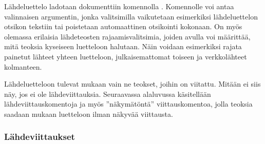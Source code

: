 \begin{koodilohkosis}



\end{koodilohkosis}

\noindent
Lähdeluettelo ladotaan dokumenttiin komennolla
. Komennolle voi antaa valinnaisen
argumentin, jonka valitsimilla vaikutetaan esimerkiksi lähdeluettelon
otsikon tekstiin tai poistetaan automaattinen otsikointi kokonaan. On
myös olemassa erilaisia lähdeteosten rajaamisvalitsimia, joiden avulla
voi määrittää, mitä teoksia kyseiseen luetteloon halutaan. Näin voidaan
esimerkiksi rajata painetut lähteet yhteen luetteloon, julkaisemattomat
toiseen ja verkkolähteet kolmanteen.

\begin{koodilohkosis}
\printbibliography
\printbibliography[title={Lähteet}]
\printbibliography[heading=none,  %
  type=online]           %
\end{koodilohkosis}

\noindent
Lähdeluetteloon tulevat mukaan vain ne teokset, joihin on viitattu.
Mitään ei siis näy, jos ei ole lähdeviittauksia. Seuraavassa alaluvussa
käsitellään lähdeviittauskomentoja ja myös ''näkymätöntä''
viittauskomentoa, jolla teoksia saadaan mukaan luetteloon ilman näkyvää
viittausta.

\subsubsection{Lähdeviittaukset}


